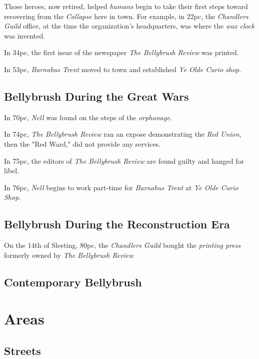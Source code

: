 \documentclass[11pt]{teraum_adventure}
\begin{document}
Those heroes, now retired, helped \emph{humans} begin to take their first
steps toward recovering from the \emph{Collapse} here in town. For example,
in 22pc, the \emph{Chandlers Guild} office, at the time the organization's
headquarters, was where the \emph{wax clock} was invented.

In 34pc, the first issue of the newspaper \emph{The Bellybrush Review} was
printed.

In 53pc, \emph{Barnabus Trent} moved to town and established \emph{Ye Olde Curio
shop}.
\subsection*{Bellybrush During the Great Wars}
\label{sec:org8d3fff1}
In 70pc, \emph{Nell} was found on the steps of the \emph{orphanage}.

In 74pc, \emph{The Bellybrush Review} ran an expose demonstrating the \emph{Red
Union}, then the "Red Ward," did not provide any services.

In 75pc, the editors of \emph{The Bellybrush Review} are found guilty and
hanged for libel.

In 76pc, \emph{Nell} begins to work part-time for \emph{Barnabus Trent} at \emph{Ye
Olde Curio Shop}.
\subsection*{Bellybrush During the Reconstruction Era}
\label{sec:orgd58acd6}
On the 14th of Sleeting, 80pc, the \emph{Chandlers Guild} bought the
\emph{printing press} formerly owned by \emph{The Bellybrush Review}
\subsection*{Contemporary Bellybrush}
\label{sec:orgd12c2fd}
\section*{Areas}
\label{sec:org73425e9}
\subsection*{Streets}
\label{sec:orgf98be35}
\end{document}
